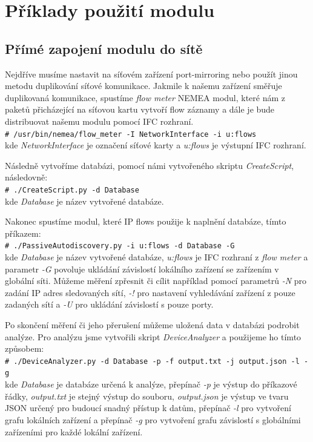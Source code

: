 \documentclass[thesis=B,czech,hidelinks]{FITthesis}[2019/03/21]
\newcommand{\shellcmd}[1]{\\\indent\indent\texttt{\footnotesize\# #1}\\}
\begin{document}
\chapter{Příklady použití modulu}
    \section{Přímé zapojení modulu do sítě}
    Nejdříve musíme nastavit na síťovém zařízení port-mirroring nebo použít jinou metodu duplikování síťové komunikace. Jakmile k našemu zařízení směřuje duplikovaná komunikace, spustíme \emph{flow meter} NEMEA modul, které nám z paketů přicházející na síťovou kartu vytvoří flow záznamy a dále je bude distribuovat našemu modulu pomocí IFC rozhraní. 
    \shellcmd{/usr/bin/nemea/flow\_meter -I NetworkInterface -i u:flows}
         kde \emph{NetworkInterface} je označení síťové karty a \emph{u:flows} je výstupní IFC rozhraní.
        
        Následně vytvoříme databázi, pomocí námi vytvořeného skriptu \emph{CreateScript}, následovně:
        \shellcmd{./CreateScript.py -d Database}
         kde \emph{Database} je název vytvořené databáze.
        
        Nakonec spustíme modul, které IP flows použije k naplnění databáze, tímto příkazem:
        \shellcmd{./PassiveAutodiscovery.py -i u:flows -d Database -G}
         kde \emph{Database} je název vytvořené databáze, \emph{u:flows} je IFC rozhraní z \emph{flow meter} a parametr \emph{-G} povoluje ukládání závislostí lokálního zařízení se zařízením v globální síti. Můžeme měření zpřesnit či cílit například pomocí parametrů \emph{-N} pro zadání IP adres sledovaných sítí, \emph{-!} pro nastavení vyhledávání zařízení z pouze zadaných sítí a \emph{-U} pro ukládání závislostí s pouze  porty.
        
        Po skončení měření či jeho přerušení můžeme uložená data v databázi podrobit analýze. Pro analýzu jsme vytvořili skript \emph{DeviceAnalyzer} a použijeme ho tímto způsobem:
        \shellcmd{./DeviceAnalyzer.py -d Database -p -f output.txt -j output.json -l -g}
         kde \emph{Database} je databáze určená k analýze, přepínač \emph{-p} je výstup do příkazové řádky, \emph{output.txt} je stejný výstup do souboru, \emph{output.json} je výstup ve tvaru JSON určený pro budoucí snadný přístup k datům, přepínač \emph{-l} pro vytvoření grafu lokálních zařízení a přepínač \emph{-g} pro vytvoření grafu závislostí s globálními zařízeními pro každé lokální zařízení.
        
\end{document}
